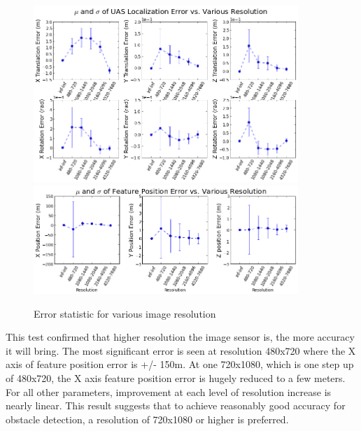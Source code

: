 \begin{figure}[h]
  \centering
  \includegraphics[width=10cm,keepaspectratio=true]{./Figures/SimulationFigures/Figure50.png}
  \includegraphics[width=10cm,keepaspectratio=true]{./Figures/SimulationFigures/Figure49.png}
  \caption{Error statistic for various image resolution}
  \label{fig:simfig50}
\end{figure}

This test confirmed that higher resolution the image sensor is, the
more accuracy it will bring. The most significant error is seen at
resolution 480x720 where the X axis of feature position error is +/-
150m. At one 720x1080, which is one step up of 480x720, the X axis
feature position error is hugely reduced to a few meters. For all
other parameters, improvement at each level of resolution increase is
nearly linear. This result suggests that to achieve reasonably good
accuracy for obstacle detection, a resolution of 720x1080 or higher is
preferred. 







